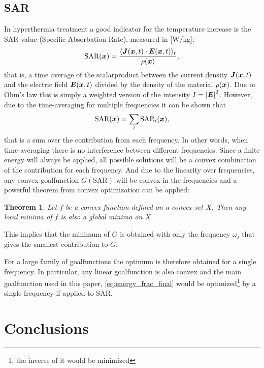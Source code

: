 \documentclass[11pt,a4paper, 
swedish,english %
]{article}
\begin{document}
\subsection{SAR}
\newtheorem{theorem}{Theorem}
In hyperthermia treatment a good indicator for the temperature increase is the SAR-value (Specific Absorbation Rate), measured in [W/kg]:
\begin{equation*}
\text{SAR}(\vb*x)=\frac{\langle \vb*J(\vb*x,t)\cdot \vb*E(\vb*x,t) \rangle_t}{\rho(\vb*x)},
\end{equation*}
that is, a time average of the scalarproduct between the current density $\vb*J(\vb*x,t)$ and the electric field $\vb*E(\vb*x,t)$ divided by the density of the material $\rho(\vb*x)$. Due to Ohm's law this is simply a weighted version of the intensity $I=\abs{\vb*E}^2$. However, due to the time-averaging for multiple frequencies it can be shown that
\begin{equation}
\text{SAR}(\vb*x)=\sum_i\text{SAR}_i(\vb*x),         %
\end{equation}
that is a sum over the contribution from each frequency. In other words, when time-averaging there is no interference between different frequencies.
Since a finite energy will always be applied, all possible solutions will be a convex combination of the contribution for each frequency. And due to the linearity over frequencies, any convex goalfunction $G(\text{SAR})$ will be convex in the frequencies and a powerful theorem from convex optimization can be applied:
\begin{theorem}
 Let $f$ be a convex function defined on a convex set $X$. Then any local minima of $f$ is also a global minima on $X$.
\end{theorem}
This implies that the minimum of $G$ is obtained with only the frequency $\omega_j$ that gives the smallest contribution to $G$.

For a large family of goalfunctions the optimum is therefore obtained for a single frequency. In particular, any linear goalfunction is also convex and the main goalfunction used in this paper, \eqref{eq:energy_frac_final} would be optimized\footnote{the inverse of it would be minimized} by a single frequency if applied to SAR. 

\section{Conclusions}
\end{document}
